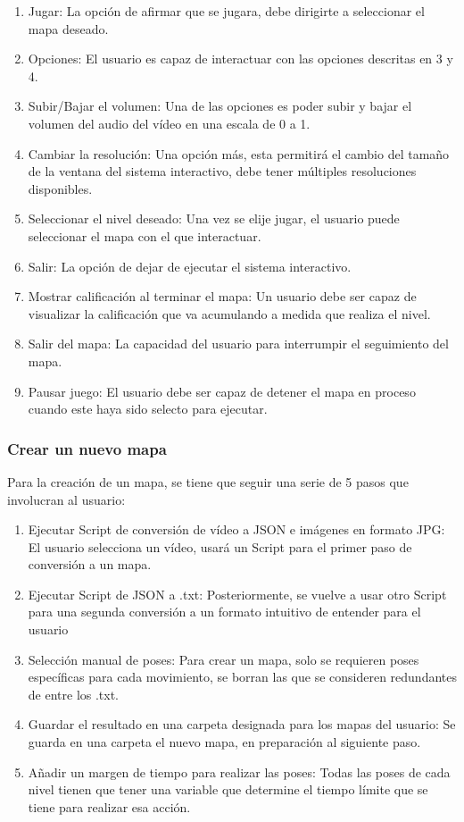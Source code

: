 \begin{enumerate}
	\item Jugar: La opción de afirmar que se jugara, debe dirigirte a seleccionar el mapa deseado.
	\item Opciones: El usuario es capaz de interactuar con las opciones descritas en 3 y 4.
	\item Subir/Bajar el volumen: Una de las opciones es poder subir y bajar el volumen del audio del vídeo en una escala de 0 a 1.
	\item Cambiar la resolución: Una opción más, esta permitirá el cambio del tamaño de la ventana del sistema interactivo, debe tener múltiples resoluciones disponibles.
	\item Seleccionar el nivel deseado: Una vez se elije jugar, el usuario puede seleccionar el mapa con el que interactuar.
	\item Salir: La opción de dejar de ejecutar el sistema interactivo.
	\item Mostrar calificación al terminar el mapa: Un usuario debe ser capaz de visualizar la calificación que va acumulando a medida que realiza el nivel.
	\item Salir del mapa: La capacidad del usuario para interrumpir el seguimiento del mapa.
	\item Pausar juego: El usuario debe ser capaz de detener el mapa en proceso cuando este haya sido selecto para ejecutar.
\end{enumerate}

\subsubsection{Crear un nuevo mapa}

Para la creación de un mapa, se tiene que seguir una serie de 5 pasos que involucran al usuario:

\begin{enumerate}
	\item Ejecutar Script de conversión de vídeo a JSON e imágenes en formato JPG: El usuario selecciona un vídeo, usará un Script para el primer paso de conversión a un mapa.
	\item Ejecutar Script de JSON a .txt: Posteriormente, se vuelve a usar otro Script para una segunda conversión a un formato intuitivo de entender para el usuario
	\item Selección manual de poses: Para crear un mapa, solo se requieren poses específicas para cada movimiento, se borran las que se consideren redundantes de entre los .txt.
	\item Guardar el resultado en una carpeta designada para los mapas del usuario: Se guarda en una carpeta el nuevo mapa, en preparación al siguiente paso.
	\item Añadir un margen de tiempo para realizar las poses: Todas las poses de cada nivel tienen que tener una variable que determine el tiempo límite que se tiene para realizar esa acción. 
\end{enumerate}

